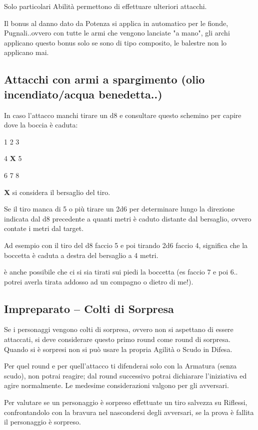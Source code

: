 \documentclass[a4paper,11pt,twoside,openany]{book}
\begin{document}
Solo particolari Abilità permettono di effettuare ulteriori attacchi.

Il bonus al danno dato da Potenza si applica in automatico per le fionde, Pugnali..ovvero con tutte le armi che vengono lanciate "a mano", gli archi applicano questo bonus solo se sono di tipo composito, le balestre non lo applicano mai.

\subsection{Attacchi con armi a spargimento (olio incendiato/acqua benedetta..)}

In caso l'attacco manchi tirare un d8 e consultare questo schemino per capire dove la boccia è caduta:

1 2 3

4 \textbf{X} 5

6 7 8

\textbf{X} si considera il bersaglio del tiro.

Se il tiro manca di 5 o più tirare un 2d6 per determinare lungo la direzione indicata dal d8 precedente a quanti metri è caduto distante dal bersaglio, ovvero contate i metri dal target.

Ad esempio con il tiro del d8 faccio 5 e poi tirando 2d6 faccio 4, significa che la boccetta è caduta a destra del bersaglio a 4 metri.

è anche possibile che ci si sia tirati sui piedi la boccetta (es faccio 7 e poi 6.. potrei averla tirata addosso ad un compagno o dietro di me!).

\subsection{Impreparato -- Colti di Sorpresa}

Se i personaggi vengono colti di sorpresa, ovvero non si aspettano di essere attaccati, si deve considerare questo primo round come round di sorpresa. Quando si è sorpresi non si può usare la propria Agilità o Scudo in Difesa.

Per quel round e per quell'attacco ti difenderai solo con la Armatura (senza scudo), non potrai reagire; dal round successivo potrai dichiarare l'iniziativa ed agire normalmente. Le medesime considerazioni valgono per gli avversari.

Per valutare se un personaggio è sorpreso effettuate un tiro salvezza su Riflessi, confrontandolo con la bravura nel nascondersi degli avversari, se la prova è fallita il personaggio è sorpreso.
\end{document}
